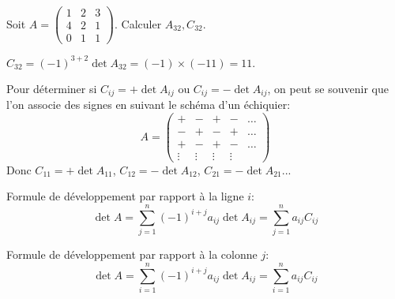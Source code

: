 \documentclass{book}
\begin{document}
\begin{Exemple}
Soit $ A =
\begin{pmatrix}
1 & 2 & 3\\
4 & 2 & 1\\
0 & 1 & 1
\end{pmatrix}$.
Calculer $A_{32}, C_{32}$.
\begin{Demonstration}
$C_{32} = (-1)^{3+2} \det A_{32} = (-1) \times (-11) =  11.$
\end{Demonstration}
\end{Exemple}
\begin{Remarque}
Pour déterminer si $C_{ij} = +\det A_{ij} $ ou $C_{ij} = -\det A_{ij}$, on peut se souvenir
que l'on associe des signes en suivant le schéma d'un échiquier:
$$  A =
\begin{pmatrix}
+ & - & + & - &\dots\\
- & + & - & + &\dots \\
+ & - & + & - &\dots\\
\vdots & \vdots & \vdots & \vdots &
\end{pmatrix}
$$
Donc $C_{11} = +\det A_{11}$, $C_{12} = - \det A_{12}$,  $C_{21} = - \det A_{21}$...
\end{Remarque}





\begin{Theoreme}
Formule de développement par rapport à la ligne $i$:
$$\det A
= \sum_{j=1}^n (-1)^{i+j} a_{ij} \det A_{ij}
= \sum_{j=1}^n a_{ij} C_{ij}$$

Formule de développement par rapport à la colonne $j$:
$$\det A
= \sum_{i=1}^n (-1)^{i+j} a_{ij} \det A_{ij}
= \sum_{i=1}^n a_{ij}C_{ij}$$
\end{Theoreme}
\end{document}
